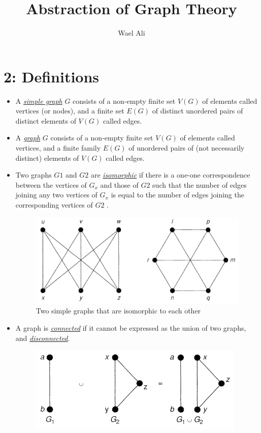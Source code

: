 \documentclass[12pt,a4paper, twocolumn]{article}
\author{Wael Ali}
\date{}
\title{Abstraction of Graph Theory}
\begin{document}
\newcommand{\hsplit}{\rule{\linewidth}{1pt}\\}

\maketitle
\section*{2: Definitions}
\begin{itemize}
\item A \underline{\emph{\color{magenta} simple graph}} $G$ consists of a non-empty finite set $V(G)$ of elements called vertices
(or nodes), and a finite set $E(G)$ of distinct unordered pairs of distinct elements of $V(G)$ called edges.
\item A \underline{\emph{\color{magenta} graph}} $G$ consists of a non-empty finite set $V(G)$ of elements called vertices, and a finite family $E(G)$ of unordered pairs of (not necessarily distinct) elements of $V(G)$ called edges.
\item Two graphs $G1$ and $G2$ are \underline{\emph{\color{magenta} isomorphic}} if there is a one-one correspondence between the vertices of $G_x$ and those of $G2$ such that the number of edges joining any two vertices of $G_x$ is equal to the number of edges joining the corresponding vertices of $G2$ .
	\begin{figure}[h!]
	\centering
	\includegraphics[scale=0.4]{figures/isomorphism1.png}
	\caption{Two simple graphs that are isomorphic to each other}
	\end{figure}
\item A graph is \underline{\emph{\color{magenta} connected}} if it cannot be expressed as the union of two graphs, and \underline{\emph{\color{magenta} disconnected}}.
	\begin{figure}[h!]
	\centering
	\includegraphics[scale=0.5]{figures/graphUion.png}

\end{figure}
\end{itemize}
\end{document}
